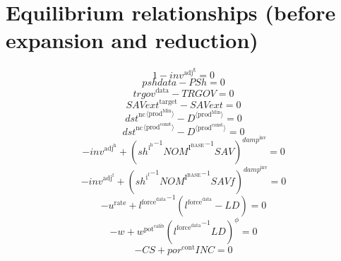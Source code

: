 \section{Equilibrium relationships (before expansion and reduction)}

\begin{equation}
1 - {i\!n\!v}^{\mathrm{adj}^{\mathrm{g}}} = 0
\end{equation}
\begin{equation}
{p\!s\!h\!d\!a\!t\!a} - {P\!S\!h} = 0
\end{equation}
\begin{equation}
{t\!r\!g\!o\!v}^{\mathrm{data}} - {T\!R\!G\!O\!V} = 0
\end{equation}
\begin{equation}
{S\!A\!V\!e\!x\!t}^{\mathrm{target}} - {S\!A\!V\!e\!x\!t} = 0
\end{equation}
\begin{equation}
{{d\!s\!t}^{\mathrm{nc}}}^{\langle \mathrm{\mathrm{prod}^{\mathrm{Min}}}\rangle} - {D}^{\langle \mathrm{prod}^{\mathrm{Min}}\rangle} = 0
\end{equation}
\begin{equation}
{{d\!s\!t}^{\mathrm{nc}}}^{\langle \mathrm{\mathrm{prod}^{\mathrm{const}}}\rangle} - {D}^{\langle \mathrm{prod}^{\mathrm{const}}\rangle} = 0
\end{equation}
\begin{equation}
-{i\!n\!v}^{\mathrm{adj}^{\mathrm{h}}} + \left({{s\!h}^{\mathrm{i}^{\mathrm{h}}}}^{-1} {{N\!O\!M}^{\mathrm{I}^{\mathrm{BASE}}}}^{-1} {{S\!A\!V}}\right)^{{d\!a\!m\!p}^{\mathrm{inv}}} = 0
\end{equation}
\begin{equation}
-{i\!n\!v}^{\mathrm{adj}^{\mathrm{f}}} + \left({{s\!h}^{\mathrm{i}^{\mathrm{f}}}}^{-1} {{N\!O\!M}^{\mathrm{I}^{\mathrm{BASE}}}}^{-1} {{S\!A\!V\!f}}\right)^{{d\!a\!m\!p}^{\mathrm{inv}}} = 0
\end{equation}
\begin{equation}
-u^{\mathrm{rate}} + {l^{\mathrm{force}^{\mathrm{data}}}}^{-1} \left(l^{\mathrm{force}^{\mathrm{data}}} - {L\!D}\right) = 0
\end{equation}
\begin{equation}
-w + {w^{\mathrm{pot}^{\mathrm{calib}}}} {\left({l^{\mathrm{force}^{\mathrm{data}}}}^{-1} {{L\!D}}\right)^{\phi}} = 0
\end{equation}
\begin{equation}
-{C\!S} + {{p\!o\!r}^{\mathrm{cont}}} {{I\!N\!C}} = 0
\end{equation}
